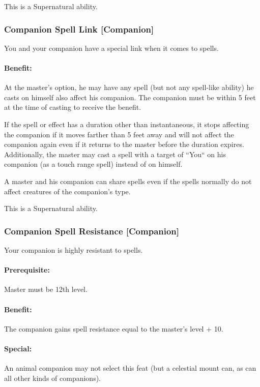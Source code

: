 This is a Supernatural ability.
\subsubsection[Companion Spell Link]{Companion Spell Link [Companion]}
\label{Feat:CompanionSpellLink}
You and your companion have a special link when it comes to spells.

\paragraph{Benefit:} At the master's option, he may have any spell (but not any spell-like ability) he casts on himself also affect his companion. 
The companion must be within 5 feet at the time of casting to receive the benefit.

If the spell or effect has a duration other than instantaneous, 
it stops affecting the companion if it moves farther than 5 feet away and will not affect the companion again even if it returns to the master before the duration expires. 
Additionally, the master may cast a spell with a target of ``You`` on his companion (as a touch range spell) instead of on himself.

A master and his companion can share spells even if the spells normally do not affect creatures of the companion's type. 

This is a Supernatural ability.
\subsubsection[Companion Spell Resistance]{Companion Spell Resistance [Companion]}
\label{Feat:CompanionSpellResistance}
Your companion is highly resistant to spells.

\paragraph{Prerequisite:} Master must be 12th level.

\paragraph{Benefit:} The companion gains spell resistance equal to the master's level + 10.

\paragraph{Special:} An animal companion may not select this feat (but a celestial mount can, as can all other kinds of companions).
